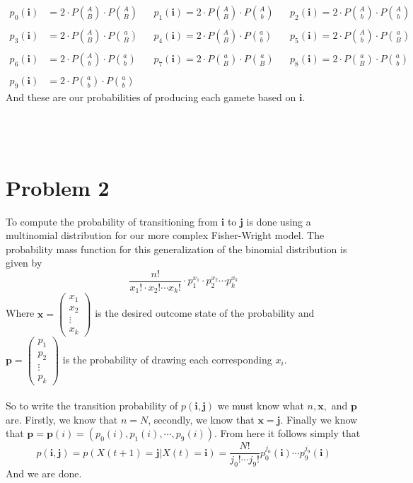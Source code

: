 \documentclass{article}
\theoremstyle{definition}
\begin{document}
\begin{align*}
    p_0(\bm i) &= 2 \cdot P{A \choose B} \cdot P{A \choose B} &&
    p_1(\bm i) = 2 \cdot P{A \choose B} \cdot P{A \choose b} &&
    p_2(\bm i) = 2 \cdot P{A \choose b} \cdot P{A \choose b} \\\\
    p_3(\bm i) &= 2 \cdot P{A \choose B} \cdot P{a \choose B} &&
    p_4(\bm i) = 2 \cdot P{A \choose B} \cdot P{a \choose b} &&
    p_5(\bm i) = 2 \cdot P{A \choose b} \cdot P{a \choose B} \\\\
    p_6(\bm i) &= 2 \cdot P{A \choose b} \cdot P{a \choose b} &&
    p_7(\bm i) = 2 \cdot P{a \choose B} \cdot P{a \choose B} &&
    p_8(\bm i) = 2 \cdot P{a \choose B} \cdot P{a \choose b} \\\\
    p_9(\bm i) &= 2 \cdot P{a \choose b} \cdot P{a \choose b}
\end{align*}
And these are our probabilities of producing each gamete based on $\bm i$.
\\\\\\\\
\section*{Problem 2}
To compute the probability of transitioning from $\bm i$ to $\bm j$ is done using a multinomial distribution for 
our more complex Fisher-Wright model. The probability mass function for this generalization of the binomial distribution is given by 
\[
    \frac{n!}{x_1! \cdot x_2! \cdots x_k!} \cdot p_1^{x_1} \cdot p_2^{x_2} \cdots p_k^{x_k}
\]
Where $\bm x = \begin{pmatrix}
    x_1\\x_2\\ \vdots\\x_k
\end{pmatrix}$ is the desired outcome state of the probability and $\bm p = \begin{pmatrix}
    p_1\\p_2\\ \vdots \\ p_k
\end{pmatrix}$ is the probability of drawing each corresponding $x_i$.\\\\
So to write the transition probability of $p(\bm i, \bm j)$ we must know what $n, \bm x,$ and $\bm p$ are.
Firstly, we know that $n = N$, secondly, we know that $\bm x = \bm j$. Finally we know that $\bm p = \bm p(i) = (p_0(i), p_1(i),\cdots,p_9(i))$.
From here it follows simply that
\[
    p(\bm i, \bm j) = p(X(t+1) = \bm j | X(t) = \bm i) = \frac{N!}{j_0! \cdots j_9!}p_0^{j_0}(\bm i) \cdots p_9^{j_9}(\bm i)
\]
And we are done.
\end{document}
